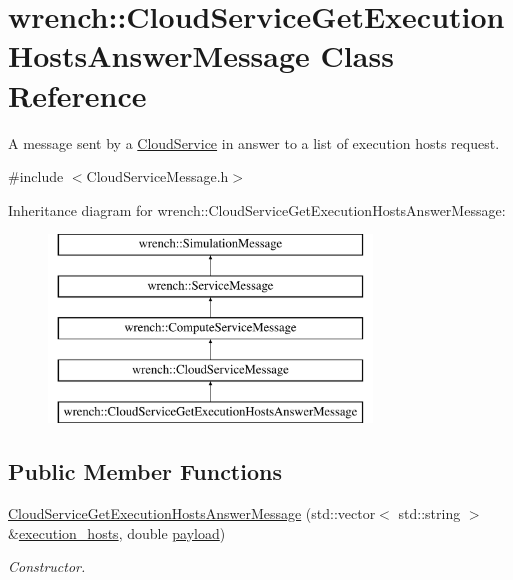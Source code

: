 \hypertarget{classwrench_1_1_cloud_service_get_execution_hosts_answer_message}{}\section{wrench\+:\+:Cloud\+Service\+Get\+Execution\+Hosts\+Answer\+Message Class Reference}
\label{classwrench_1_1_cloud_service_get_execution_hosts_answer_message}


A message sent by a \hyperlink{classwrench_1_1_cloud_service}{Cloud\+Service} in answer to a list of execution hosts request.  




{\ttfamily \#include $<$Cloud\+Service\+Message.\+h$>$}

Inheritance diagram for wrench\+:\+:Cloud\+Service\+Get\+Execution\+Hosts\+Answer\+Message\+:\begin{figure}[H]
\begin{center}
\leavevmode
\includegraphics[height=5.000000cm]{classwrench_1_1_cloud_service_get_execution_hosts_answer_message}
\end{center}
\end{figure}
\subsection*{Public Member Functions}
\begin{DoxyCompactItemize}
\item 
\hyperlink{classwrench_1_1_cloud_service_get_execution_hosts_answer_message_ad93e8d5854d8dbea1a2047470d589b1a}{Cloud\+Service\+Get\+Execution\+Hosts\+Answer\+Message} (std\+::vector$<$ std\+::string $>$ \&\hyperlink{classwrench_1_1_cloud_service_get_execution_hosts_answer_message_a67f806437e0c981b2b6a907832b6e0e7}{execution\+\_\+hosts}, double \hyperlink{classwrench_1_1_simulation_message_a914f2732713f7c02898e66f05a7cb8a1}{payload})
\begin{DoxyCompactList}\small\item\em Constructor. \end{DoxyCompactList}\end{DoxyCompactItemize}
